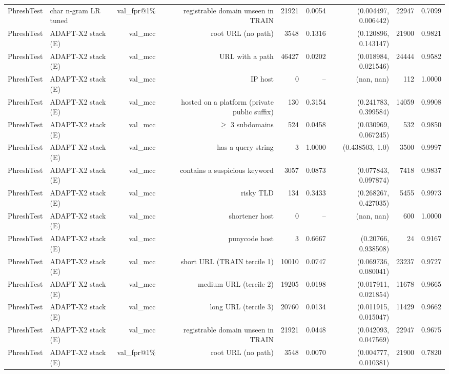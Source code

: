\begin{table}[t]
\begin{tabular}{llrrrrrrr}
PhreshTest & char n-gram LR tuned & val\_fpr@1\% & registrable domain unseen in TRAIN & 21921 & 0.0054 & (0.004497, 0.006442) & 22947 & 0.7099 \\
PhreshTest & ADAPT-X2 stack (E) & val\_mcc & root URL (no path) & 3548 & 0.1316 & (0.120896, 0.143147) & 21900 & 0.9821 \\
PhreshTest & ADAPT-X2 stack (E) & val\_mcc & URL with a path & 46427 & 0.0202 & (0.018984, 0.021546) & 24444 & 0.9582 \\
PhreshTest & ADAPT-X2 stack (E) & val\_mcc & IP host & 0 & -- & (nan, nan) & 112 & 1.0000 \\
PhreshTest & ADAPT-X2 stack (E) & val\_mcc & hosted on a platform (private public suffix) & 130 & 0.3154 & (0.241783, 0.399584) & 14059 & 0.9908 \\
PhreshTest & ADAPT-X2 stack (E) & val\_mcc & $\geq$ 3 subdomains & 524 & 0.0458 & (0.030969, 0.067245) & 532 & 0.9850 \\
PhreshTest & ADAPT-X2 stack (E) & val\_mcc & has a query string & 3 & 1.0000 & (0.438503, 1.0) & 3500 & 0.9997 \\
PhreshTest & ADAPT-X2 stack (E) & val\_mcc & contains a suspicious keyword & 3057 & 0.0873 & (0.077843, 0.097874) & 7418 & 0.9837 \\
PhreshTest & ADAPT-X2 stack (E) & val\_mcc & risky TLD & 134 & 0.3433 & (0.268267, 0.427035) & 5455 & 0.9973 \\
PhreshTest & ADAPT-X2 stack (E) & val\_mcc & shortener host & 0 & -- & (nan, nan) & 600 & 1.0000 \\
PhreshTest & ADAPT-X2 stack (E) & val\_mcc & punycode host & 3 & 0.6667 & (0.20766, 0.938508) & 24 & 0.9167 \\
PhreshTest & ADAPT-X2 stack (E) & val\_mcc & short URL (TRAIN tercile 1) & 10010 & 0.0747 & (0.069736, 0.080041) & 23237 & 0.9727 \\
PhreshTest & ADAPT-X2 stack (E) & val\_mcc & medium URL (tercile 2) & 19205 & 0.0198 & (0.017911, 0.021854) & 11678 & 0.9665 \\
PhreshTest & ADAPT-X2 stack (E) & val\_mcc & long URL (tercile 3) & 20760 & 0.0134 & (0.011915, 0.015047) & 11429 & 0.9662 \\
PhreshTest & ADAPT-X2 stack (E) & val\_mcc & registrable domain unseen in TRAIN & 21921 & 0.0448 & (0.042093, 0.047569) & 22947 & 0.9675 \\
PhreshTest & ADAPT-X2 stack (E) & val\_fpr@1\% & root URL (no path) & 3548 & 0.0070 & (0.004777, 0.010381) & 21900 & 0.7820 \\

\end{tabular}
\end{table}
